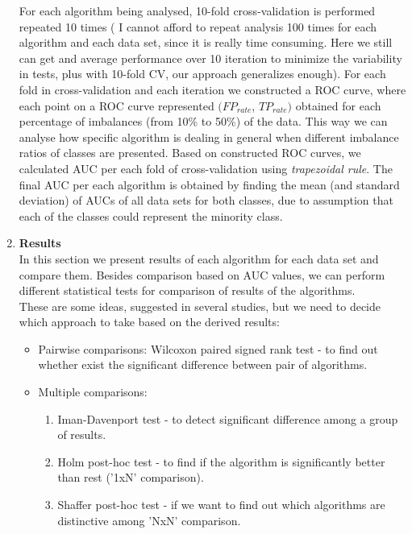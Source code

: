 \documentclass[a4paper]{article}
\begin{document}
\begin{enumerate}[I]
\color{black}
For each algorithm being analysed, 10-fold cross-validation is performed repeated 10 times (\color{red} I cannot afford to repeat analysis 100 times for each algorithm and each data set, since it is really time consuming. Here we still can get and average performance over 10 iteration to minimize the variability in tests, plus with 10-fold CV, our approach generalizes enough\color{black}). For each fold in cross-validation and each iteration we constructed a ROC curve, where each point on a ROC curve represented $(FP_{rate}$, $TP_{rate})$ obtained for each percentage of imbalances (from 10\% to 50\%) of the data. This way we can analyse how specific algorithm is dealing in general when different imbalance ratios of classes are presented. Based on constructed ROC curves, we calculated AUC per each fold of cross-validation using \textit{trapezoidal rule}. The final AUC per each algorithm is obtained by finding the mean (and standard deviation) of AUCs of all data sets for both classes, due to assumption that each of the classes could represent the minority class.

\item \textbf{Results}
\\
In this section we present results of each algorithm for each data set and compare them. Besides comparison based on AUC values, we can perform different statistical tests for comparison of results of the algorithms. 
\\
\color{red} These are some ideas, suggested in several studies, but we need to decide which approach to take based on the derived results:
\begin{itemize}
\item Pairwise comparisons: Wilcoxon paired signed rank test - to find out whether exist the significant difference between pair of algorithms.
\item Multiple comparisons:
	\begin{enumerate}
	\item Iman-Davenport test - to detect significant difference among a group of results.
	\item Holm post-hoc test - to find if the algorithm is significantly better than rest ('1xN' comparison).
	\item Shaffer post-hoc test - if we want to find out which algorithms are distinctive among 'NxN' comparison.
	\end{enumerate}
\end{itemize} 
\end{enumerate}
\end{document}
